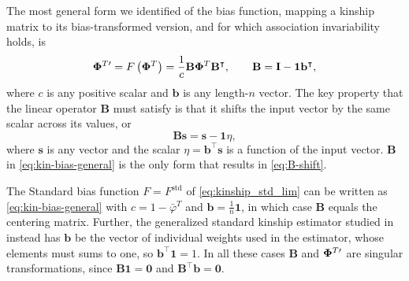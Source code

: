 \documentclass[11pt]{article}
\newcommand{\kinMat}[1][T]{%
  \ensuremath{%
    \mathbf{\Phi}^{#1}
  }%
  \xspace%
}%
\newcommand{\kinMatPrime}{%
  \ensuremath{%
    \mathbf{\Phi}^{T\prime}
  }%
  \xspace%
}%
\begin{document}
The most general form we identified of the bias function, mapping a kinship matrix to its bias-transformed version, and for which association invariability holds, is
\begin{equation}
  \label{eq:kin-bias-general}
  \kinMatPrime
  =
  F \left( \kinMat \right)
  =
  \frac{1}{c}
  \mathbf{B} \kinMat \mathbf{B}^\intercal
  , \quad\quad
  \mathbf{B}
  =
  \mathbf{I} - \mathbf{1} \mathbf{b}^\intercal
  ,
\end{equation}
where $c$ is any positive scalar and $\mathbf{b}$ is any length-$n$ vector.
The key property that the linear operator $\mathbf{B}$ must satisfy is that it shifts the input vector by the same scalar across its values, or
\begin{equation}
  \label{eq:B-shift}
  \mathbf{B} \mathbf{s}
  =
  \mathbf{s} - \mathbf{1} \eta
  ,
\end{equation}
where $\mathbf{s}$ is any vector and the scalar $\eta = \mathbf{b}^\intercal \mathbf{s}$ is a function of the input vector.
$\mathbf{B}$ in \cref{eq:kin-bias-general} is the only form that results in \cref{eq:B-shift}.

The Standard bias function $F = F^\text{std}$ of \cref{eq:kinship_std_lim} can be written as \cref{eq:kin-bias-general} with
$c = 1 - \bar{\varphi}^T$ and
$\mathbf{b} = \frac{1}{n} \mathbf{1}$, in which case $\mathbf{B}$ equals the centering matrix.
Further, the generalized standard kinship estimator studied in \citet{ochoa_estimating_2021} instead has $\mathbf{b}$ be the vector of individual weights used in the estimator, whose elements must sums to one, so $\mathbf{b}^\intercal \mathbf{1} = 1$.
In all these cases $\mathbf{B}$ and $\kinMatPrime$ are singular transformations, since $\mathbf{B} \mathbf{1} = \mathbf{0}$ and $\mathbf{B}^\intercal \mathbf{b} = \mathbf{0}$.
\end{document}
